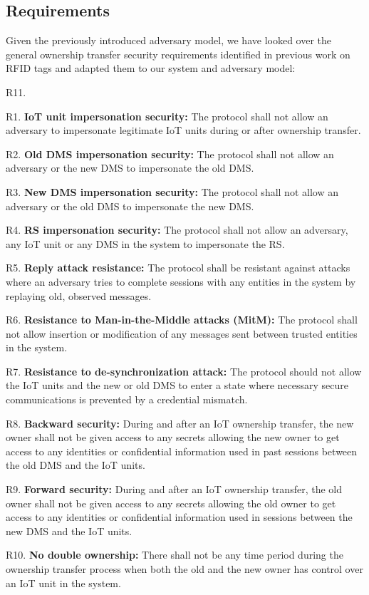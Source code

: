 {\subsection{Requirements}
\label{sec:ot:requirements}
Given the previously introduced adversary model, we have looked over the general ownership transfer security requirements identified in previous work on RFID tags \cite{taqieddin2018tag} and adapted them to our system and adversary model: 
\begin{labeling}{R11.}
\item [R1.] \textbf{IoT unit impersonation security:} The protocol shall not allow an adversary to impersonate legitimate IoT units during or after ownership transfer.
\item [R2.] \textbf{Old DMS impersonation security:} The protocol shall not allow an adversary or the new DMS to impersonate the old DMS.
\item [R3.] \textbf{New DMS impersonation security:} The protocol shall not allow an adversary or the old DMS to impersonate the new DMS.
\item [R4.] \textbf{RS impersonation security:} The protocol shall not allow an adversary, any IoT unit or any DMS in the system to impersonate the RS.
\item [R5.] \textbf{Reply attack resistance:} The protocol shall be resistant against attacks where an adversary tries to complete sessions with any entities in the system by replaying old, observed messages.
\item [R6.] \textbf{Resistance to Man-in-the-Middle attacks (MitM):} The protocol shall not allow insertion or modification of any messages sent between trusted entities in the system.
\item [R7.] \textbf{Resistance to de-synchronization attack:} The protocol should not allow the IoT units and the new or old DMS to enter a state where necessary secure communications is prevented by a credential mismatch. 
\item [R8.] \textbf{Backward security:} During and after an IoT ownership transfer, the new owner shall not be given access to any secrets allowing the new owner to get access to any identities or confidential information used in past sessions between the old DMS and the IoT units.
\item [R9.] \textbf{Forward security:} During and after an IoT ownership transfer, the old owner shall not be given access to any secrets allowing the old owner to get access to any identities or confidential information used in sessions between the new DMS and the IoT units.
 \item [R10.] \textbf{No double ownership:} There shall not be any time period during the ownership transfer process when both the old and the new owner has control over an IoT unit in the system.
\end{labeling}

}
